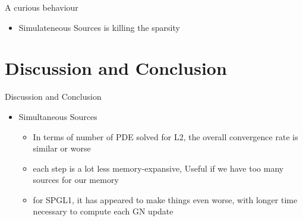 \documentclass[12pt]{beamer}
\begin{document}
\begin{frame}{A curious behaviour}
\begin{itemize}
  \item Simulateneous Sources is killing the sparsity
\end{itemize}
\begin{figure}
\end{figure}

\end{frame}


\section{Discussion and Conclusion}

\begin{frame}{Discussion and Conclusion}
\begin{itemize}
  \item Simultaneous Sources
  \vspace{10pt}
  \begin{itemize}
    \item In terms of number of PDE solved for L2, the overall convergence rate is similar or worse
    \vspace{10pt}
    \item each step is a lot less memory-expansive, Useful if we have too many sources for our memory
    \vspace{10pt}
    \item for SPGL1, it has appeared to make things even worse, with longer time necessary to compute each GN update
  \end{itemize}
\end{itemize}
\end{frame}
\end{document}
